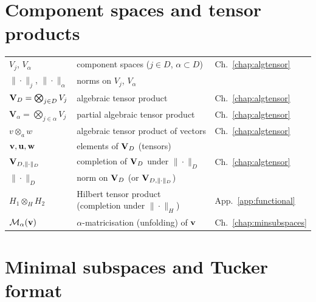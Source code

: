 \section*{Component spaces and tensor products}

\begin{tabular}{@{}p{4.5cm}p{7cm}l@{}}
$V_j$, $V_\alpha$ & component spaces ($j \in D$, $\alpha \subset D$)
    & Ch.~\ref{chap:algtensor} \\
$\|\cdot\|_j$, $\|\cdot\|_\alpha$ & norms on $V_j$, $V_\alpha$ & \\
$\mathbf{V}_D = \bigotimes_{j \in D} V_j$ & algebraic tensor product
    & Ch.~\ref{chap:algtensor} \\
$\mathbf{V}_\alpha = \bigotimes_{j \in \alpha} V_j$ & partial algebraic
    tensor product & Ch.~\ref{chap:algtensor} \\
$v \otimes_a w$ & algebraic tensor product of vectors
    & Ch.~\ref{chap:algtensor} \\
$\mathbf{v}, \mathbf{u}, \mathbf{w}$ & elements of $\mathbf{V}_D$ (tensors) & \\
$\mathbf{V}_{D,\|\cdot\|_D}$ & completion of $\mathbf{V}_D$ under $\|\cdot\|_D$
    & Ch.~\ref{chap:algtensor} \\
$\|\cdot\|_D$ & norm on $\mathbf{V}_D$ (or $\mathbf{V}_{D,\|\cdot\|_D}$) & \\
$H_1 \otimes_H H_2$ & Hilbert tensor product (completion under
    $\|\cdot\|_H$) & App.~\ref{app:functional} \\
$\mathcal{M}_{\alpha}(\mathbf{v})$ & $\alpha$-matricisation (unfolding) of $\mathbf{v}$
    & Ch.~\ref{chap:minsubspaces} \\
\end{tabular}

\section*{Minimal subspaces and Tucker format}

